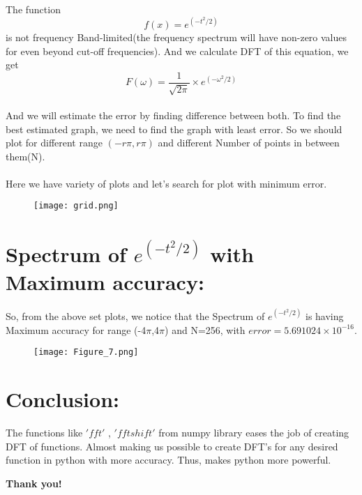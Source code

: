 \documentclass[12pt]{article}
\begin{document}
The function 
\begin{equation*}
f(x)=e^{(-t^2/2)}
\end{equation*}
is not frequency Band-limited(the frequency spectrum will have non-zero values for even beyond cut-off frequencies). And we calculate DFT of this equation, we get
\begin{equation*}
F(\omega)=\frac{1}{\sqrt{2\pi}}\times e^{(-\omega^2/2)}
\end{equation*}
\\And we will estimate the error by finding difference between both. To find the best estimated graph, we need to find the graph with least error. So we should plot for different range $(-r\pi,r\pi)$ and different Number of points in between them(N).\\\\
Here we have variety of plots and let's search for plot with minimum error.

\begin{figure}[h!]
\centering
\texttt{[image: grid.png]}
\label{fig:exemplo}
\end{figure}

\newpage
\section*{Spectrum of $e^{(-t^2/2)}$ with Maximum accuracy:}

So, from the above set plots, we notice that the Spectrum of $e^{(-t^2/2)}$ is having Maximum accuracy for range (-4$\pi$,4$\pi$) and N=256, with $error= 5.691024\times 10^{-16}$.
\begin{figure}[h!]
\centering
\texttt{[image: Figure\_7.png]}
\label{fig:exemplo}
\end{figure}

\section*{\textbf{Conclusion:}}
The functions like $'fft'$ , $'fftshift'$ from numpy library eases the job of creating DFT of functions. Almost making us possible to create DFT's for any desired function in python with more accuracy. Thus, makes python more powerful.

\begin{center} 
\textbf{Thank you!}
\end{center} 
\end{document}
